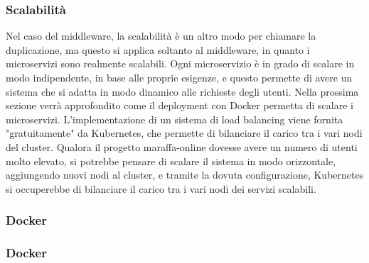 \subsubsection{Scalabilità}

Nel caso del middleware, la scalabilità è un altro modo per chiamare la duplicazione, ma questo si applica soltanto al middleware, in quanto i microservizi sono realmente scalabili.
Ogni microservizio è in grado di scalare in modo indipendente, in base alle proprie esigenze, e questo permette di avere un sistema che si adatta in modo dinamico alle richieste degli utenti. 
Nella prossima sezione verrà approfondito come il deployment con Docker permetta di scalare i microservizi. L'implementazione di un sistema di load balancing viene fornita
"gratuitamente" da Kubernetes, che permette di bilanciare il carico tra i vari nodi del cluster. 
Qualora il progetto maraffa-online dovesse avere un numero di utenti molto elevato, si potrebbe pensare di scalare il sistema in modo orizzontale, aggiungendo nuovi nodi al cluster, 
e tramite la dovuta configurazione, Kubernetes si occuperebbe di bilanciare il carico tra i vari nodi dei servizi scalabili. 

\subsubsection{Docker}

\subsubsection{Docker}
